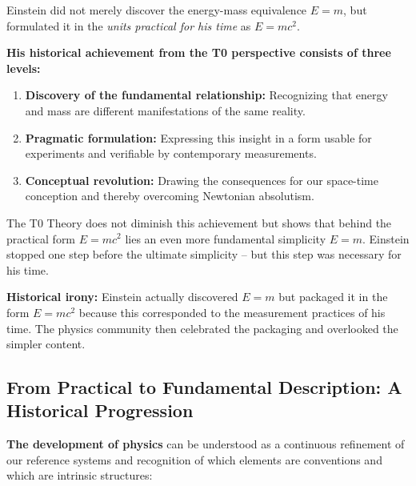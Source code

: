 	\begin{tcolorbox}[colback=green!10!white,colframe=green!75!black,title=Einstein's Pragmatic Genius Reinterpreted]
		Einstein did not merely discover the energy-mass equivalence \( E = m \), but formulated it in the \textit{units practical for his time} as \( E = mc^2 \).
		
		\textbf{His historical achievement from the T0 perspective consists of three levels:}
		
		\begin{enumerate}
			\item \textbf{Discovery of the fundamental relationship:} Recognizing that energy and mass are different manifestations of the same reality.
			
			\item \textbf{Pragmatic formulation:} Expressing this insight in a form usable for experiments and verifiable by contemporary measurements.
			
			\item \textbf{Conceptual revolution:} Drawing the consequences for our space-time conception and thereby overcoming Newtonian absolutism.
		\end{enumerate}
		
		The T0 Theory does not diminish this achievement but shows that behind the practical form \( E = mc^2 \) lies an even more fundamental simplicity \( E = m \). Einstein stopped one step before the ultimate simplicity – but this step was necessary for his time.
		
		\textbf{Historical irony:} Einstein actually discovered \( E = m \) but packaged it in the form \( E = mc^2 \) because this corresponded to the measurement practices of his time. The physics community then celebrated the packaging and overlooked the simpler content.
	\end{tcolorbox}
	
	\subsection{From Practical to Fundamental Description: A Historical Progression}
	
	\textbf{The development of physics} can be understood as a continuous refinement of our reference systems and recognition of which elements are conventions and which are intrinsic structures:
	
